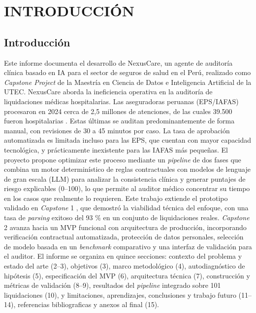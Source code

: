 
\chapter{INTRODUCCIÓN}

\section{Introducción}
{Este informe documenta el desarrollo de NexusCare, un agente de auditoría clínica basado en IA para el sector de seguros de salud en el Perú, realizado como \textit{Capstone Project} de la Maestría en Ciencia de Datos e Inteligencia Artificial de la UTEC.
NexusCare aborda la ineficiencia operativa en la auditoría de liquidaciones médicas hospitalarias. Las aseguradoras peruanas (EPS/IAFAS) procesaron en 2024 cerca de 2,5 millones de atenciones, de las cuales 39.500 fueron hospitalarias \cite{susalud2024tedef}. Estas últimas se auditan predominantemente de forma manual, con revisiones de 30 a 45 minutos por caso. La tasa de aprobación automatizada es limitada incluso para las EPS, que cuentan con mayor capacidad tecnológica, y prácticamente inexistente para las IAFAS más pequeñas. El proyecto propone optimizar este proceso mediante un \textit{pipeline} de dos fases que combina un motor determinístico de reglas contractuales con modelos de lenguaje de gran escala (LLM) para analizar la consistencia clínica y generar puntajes de riesgo explicables (0–100), lo que permite al auditor médico concentrar su tiempo en los casos que realmente lo requieren.
Este trabajo extiende el prototipo validado en \textit{Capstone} 1 \cite{hurtado2025nexuscare}, que demostró la viabilidad técnica del enfoque, con una tasa de \textit{parsing} exitoso del 93 \% en un conjunto de liquidaciones reales. \textit{Capstone} 2 avanza hacia un MVP funcional con arquitectura de producción, incorporando verificación contractual automatizada, protección de datos personales, selección de modelo basada en un \textit{benchmark} comparativo y una interfaz de validación para el auditor.
El informe se organiza en quince secciones: contexto del problema y estado del arte (2–3), objetivos (3), marco metodológico (4), autodiagnóstico de hipótesis (5), 
especificación del MVP (6), arquitectura técnica (7), construcción y métricas de validación (8–9), resultados del \textit{pipeline} integrado sobre 101 liquidaciones (10), 
y limitaciones, aprendizajes, conclusiones y trabajo futuro (11–14), referencias bibliograficas y anexos al final (15).}
\newpage
